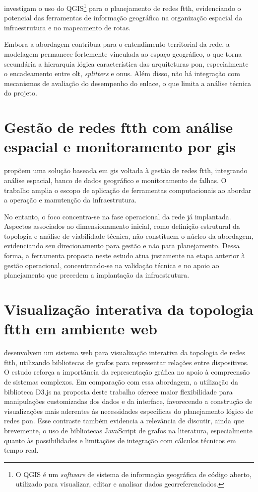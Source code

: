 investigam o uso do QGIS\footnote{O QGIS é um \textit{software} de sistema de informação geográfica de código aberto, utilizado para visualizar, editar e analisar dados georreferenciados.} para o planejamento de redes \gls{ftth}, evidenciando o potencial das ferramentas de informação geográfica na organização espacial da infraestrutura e no mapeamento de rotas.

Embora a abordagem contribua para o entendimento territorial da rede, a modelagem permanece fortemente vinculada ao espaço geográfico, o que torna secundária a hierarquia lógica característica das arquiteturas \gls{pon}, especialmente o encadeamento entre \gls{olt}, \textit{splitters} e \glspl{onu}. Além disso, não há integração com mecanismos de avaliação do desempenho do enlace, o que limita a análise técnica do projeto.

\section{Gestão de redes \gls{ftth} com análise espacial e monitoramento por \gls{gis}  \cite{chakali2025gis_ftth}}

 propõem uma solução baseada em \gls{gis} voltada à gestão de redes \gls{ftth}, integrando análise espacial, banco de dados geográfico e monitoramento de falhas. O trabalho amplia o escopo de aplicação de ferramentas computacionais ao abordar a operação e manutenção da infraestrutura. 

No entanto, o foco concentra-se na fase operacional da rede já implantada. Aspectos associados ao dimensionamento inicial, como definição estrutural da topologia e análise de viabilidade técnica, não constituem o núcleo da abordagem, evidenciando seu direcionamento para gestão e não para planejamento. Dessa forma, a ferramenta proposta neste estudo atua justamente na etapa anterior à gestão operacional, concentrando-se na validação técnica e no apoio ao planejamento que precedem a implantação da infraestrutura.

\section{Visualização interativa da topologia \gls{ftth} em ambiente web \cite{fatahillah2025visnetwork_ftth}}

 desenvolvem um sistema web para visualização interativa da topologia de redes \gls{ftth}, utilizando bibliotecas de grafos para representar relações entre dispositivos. O estudo reforça a importância da representação gráfica no apoio à compreensão de sistemas complexos. Em comparação com essa abordagem, a utilização da biblioteca D3.js na proposta deste trabalho oferece maior flexibilidade para manipulações customizadas dos dados e da interface, favorecendo a construção de visualizações mais aderentes às necessidades específicas do planejamento lógico de redes \gls{pon}. Esse contraste também evidencia a relevância de discutir, ainda que brevemente, o uso de bibliotecas JavaScript de grafos na literatura, especialmente quanto às possibilidades e limitações de integração com cálculos técnicos em tempo real.

